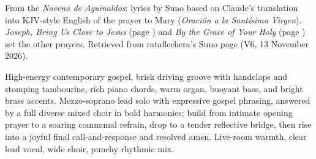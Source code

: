 
\label{sec:mary-prepare-us}
\begin{notes}
From the \emph{Novena de Aguinaldos}: lyrics by Suno based on Claude's translation into KJV-style English of the prayer to Mary (\emph{Oración a la Santísima Virgen}). \emph{Joseph, Bring Us Close to Jesus} (page \pageref{sec:joseph-bring-us-close-to-jesus}) and \emph{By the Grace of Your Holy} (page \pageref{sec:by-the-grace-of-your-holy}) set the other prayers. Retrieved from rataflechera's Suno page (V6, 13 November 2026).
\end{notes}
\begin{style}
High-energy contemporary gospel, brisk driving groove with handclaps and stomping tambourine, rich piano chords, warm organ, buoyant bass, and bright brass accents. Mezzo-soprano lead solo with expressive gospel phrasing, answered by a full diverse mixed choir in bold harmonies; build from intimate opening prayer to a soaring communal refrain, drop to a tender reflective bridge, then rise into a joyful final call-and-response and resolved amen. Live-room warmth, clear lead vocal, wide choir, punchy rhythmic mix.
\end{style}
